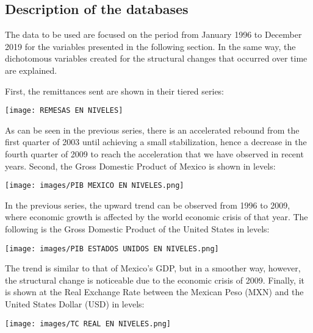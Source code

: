 \documentclass[12pt,english, spanish]{smfart}
\begin{document}
\subsection{Description of the databases}
The data to be used are focused on the period from January 1996 to December 2019 for the variables presented in the following section. In the same way, the dichotomous variables created for the structural changes that occurred over time are explained.\par
First, the remittances sent are shown in their tiered series:\par

 \texttt{[image: REMESAS EN NIVELES]}

As can be seen in the previous series, there is an accelerated rebound from the first quarter of 2003 until achieving a small stabilization, hence a decrease in the fourth quarter of 2009 to reach the acceleration that we have observed in recent years.  Second, the Gross Domestic Product of Mexico is shown in levels:\par

  \texttt{[image: images/PIB MEXICO EN NIVELES.png]}
  
	In the previous series, the upward trend can be observed from 1996 to 2009, where economic growth is affected by the world economic crisis of that year. The following is the Gross Domestic Product of the United States in levels:\par
	
   \texttt{[image: images/PIB ESTADOS UNIDOS EN NIVELES.png]}
   
The trend is similar to that of Mexico's GDP, but in a smoother way, however, the structural change is noticeable due to the economic crisis of 2009.  Finally, it is shown at the Real Exchange Rate between the Mexican Peso (MXN) and the United States Dollar (USD) in levels:\par

    \texttt{[image: images/TC REAL EN NIVELES.png]}
 
\end{document}
